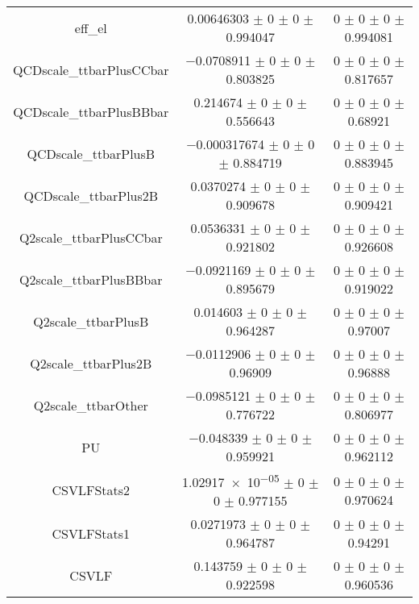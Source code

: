 \begin{table}
\begin{tabular}{ccc}
eff\_el 	& \num{0.00646303} $\pm$ \num{0} $\pm$ \num{0} $\pm$ \num{0.994047} 	& \num{0} $\pm$ \num{0} $\pm$ \num{0} $\pm$ \num{0.994081}\\
QCDscale\_ttbarPlusCCbar 	& \num{-0.0708911} $\pm$ \num{0} $\pm$ \num{0} $\pm$ \num{0.803825} 	& \num{0} $\pm$ \num{0} $\pm$ \num{0} $\pm$ \num{0.817657}\\
QCDscale\_ttbarPlusBBbar 	& \num{0.214674} $\pm$ \num{0} $\pm$ \num{0} $\pm$ \num{0.556643} 	& \num{0} $\pm$ \num{0} $\pm$ \num{0} $\pm$ \num{0.68921}\\
QCDscale\_ttbarPlusB 	& \num{-0.000317674} $\pm$ \num{0} $\pm$ \num{0} $\pm$ \num{0.884719} 	& \num{0} $\pm$ \num{0} $\pm$ \num{0} $\pm$ \num{0.883945}\\
QCDscale\_ttbarPlus2B 	& \num{0.0370274} $\pm$ \num{0} $\pm$ \num{0} $\pm$ \num{0.909678} 	& \num{0} $\pm$ \num{0} $\pm$ \num{0} $\pm$ \num{0.909421}\\
Q2scale\_ttbarPlusCCbar 	& \num{0.0536331} $\pm$ \num{0} $\pm$ \num{0} $\pm$ \num{0.921802} 	& \num{0} $\pm$ \num{0} $\pm$ \num{0} $\pm$ \num{0.926608}\\
Q2scale\_ttbarPlusBBbar 	& \num{-0.0921169} $\pm$ \num{0} $\pm$ \num{0} $\pm$ \num{0.895679} 	& \num{0} $\pm$ \num{0} $\pm$ \num{0} $\pm$ \num{0.919022}\\
Q2scale\_ttbarPlusB 	& \num{0.014603} $\pm$ \num{0} $\pm$ \num{0} $\pm$ \num{0.964287} 	& \num{0} $\pm$ \num{0} $\pm$ \num{0} $\pm$ \num{0.97007}\\
Q2scale\_ttbarPlus2B 	& \num{-0.0112906} $\pm$ \num{0} $\pm$ \num{0} $\pm$ \num{0.96909} 	& \num{0} $\pm$ \num{0} $\pm$ \num{0} $\pm$ \num{0.96888}\\
Q2scale\_ttbarOther 	& \num{-0.0985121} $\pm$ \num{0} $\pm$ \num{0} $\pm$ \num{0.776722} 	& \num{0} $\pm$ \num{0} $\pm$ \num{0} $\pm$ \num{0.806977}\\
PU 	& \num{-0.048339} $\pm$ \num{0} $\pm$ \num{0} $\pm$ \num{0.959921} 	& \num{0} $\pm$ \num{0} $\pm$ \num{0} $\pm$ \num{0.962112}\\
CSVLFStats2 	& \num{1.02917e-05} $\pm$ \num{0} $\pm$ \num{0} $\pm$ \num{0.977155} 	& \num{0} $\pm$ \num{0} $\pm$ \num{0} $\pm$ \num{0.970624}\\
CSVLFStats1 	& \num{0.0271973} $\pm$ \num{0} $\pm$ \num{0} $\pm$ \num{0.964787} 	& \num{0} $\pm$ \num{0} $\pm$ \num{0} $\pm$ \num{0.94291}\\
CSVLF 	& \num{0.143759} $\pm$ \num{0} $\pm$ \num{0} $\pm$ \num{0.922598} 	& \num{0} $\pm$ \num{0} $\pm$ \num{0} $\pm$ \num{0.960536}\\

\end{tabular}
\end{table}
